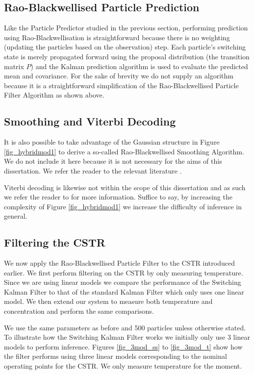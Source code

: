 \documentclass[../masters.tex]{subfiles}
\begin{document}
\subsection{Rao-Blackwellised Particle Prediction}
Like the Particle Predictor studied in the previous section, performing prediction using Rao-Blackwellisation is straightforward because there is no weighting (updating the particles based on the observation) step. Each particle's switching state is merely propagated forward using the proposal distribution (the transition matrix $P$) and the Kalman prediction algorithm is used to evaluate the predicted mean and covariance. For the sake of brevity we do not supply an algorithm because it is a straightforward simplification of the Rao-Blackwellised Particle Filter Algorithm as shown above.

\subsection{Smoothing and Viterbi Decoding}
It is also possible to take advantage of the Gaussian structure in Figure \ref{fig_hybridmod1} to derive a so-called Rao-Blackwellised Smoothing Algorithm. We do not include it here because it is not necessary for the aims of this dissertation. We refer the reader to the relevant literature \cite{chen}\cite{doucet}. 

Viterbi decoding is likewise not within the scope of this dissertation and as such we refer the reader to \cite{murphy1} for more information. Suffice to say, by increasing the complexity of Figure \ref{fig_hybridmod1} we increase the difficulty of inference in general.

\subsection{Filtering the CSTR}
We now apply the Rao-Blackwellised Particle Filter to the CSTR introduced earlier. We first perform filtering on the CSTR by only measuring temperature. Since we are using linear models we compare the performance of the Switching Kalman Filter to that of the standard Kalman Filter which only uses one linear model. We then extend our system to measure both temperature and concentration and perform the same comparisons.

We use the same parameters as before and 500 particles unless otherwise stated. To illustrate how the Switching Kalman Filter works we initially only use 3 linear models to perform inference. Figures \ref{fig_3mod_ss} to \ref{fig_3mod_t} show how  the filter performs using three linear models corresponding to the nominal operating points for the CSTR. We only measure temperature for the moment.
\end{document}
